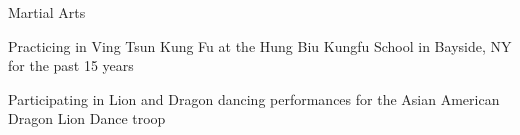 


\begin{cventries}


\cventry
{Martial Arts} %
{}
{}
{}
{%
\begin{cvitems}
\item {Practicing in Ving Tsun Kung Fu at the Hung Biu Kungfu School in Bayside, NY for the past 15 years}
\item {Participating in Lion and Dragon dancing performances for the Asian American Dragon Lion Dance troop}
\end{cvitems}
}


\end{cventries}
